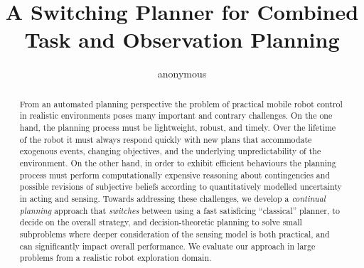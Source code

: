 \documentclass[letterpaper]{article}
\title{A Switching Planner for Combined Task and Observation Planning}
\author{anonymous}
\begin{document}
 
\maketitle

\begin{abstract}


From an automated planning perspective the problem of practical mobile
robot control in realistic environments poses many important and
contrary challenges.  On the one hand, the planning process must be
lightweight, robust, and timely. Over the lifetime of the robot it
must always respond quickly with new plans that accommodate exogenous
events, changing objectives, and the underlying unpredictability of
the environment.  On the other hand, in order to exhibit efficient
behaviours the planning process must perform computationally expensive
reasoning about contingencies and possible revisions of subjective
beliefs according to quantitatively modelled uncertainty in acting and
sensing.
Towards addressing these challenges, we develop a \emph{continual
planning} approach that {\em switches} between using a fast
satisficing ``classical'' planner, to decide on the overall strategy,
and decision-theoretic planning to solve small subproblems where
deeper consideration of the sensing model is both practical, and can
significantly impact overall performance. We evaluate our approach
in large problems from a realistic robot exploration domain.






\end{abstract}

\end{document}
